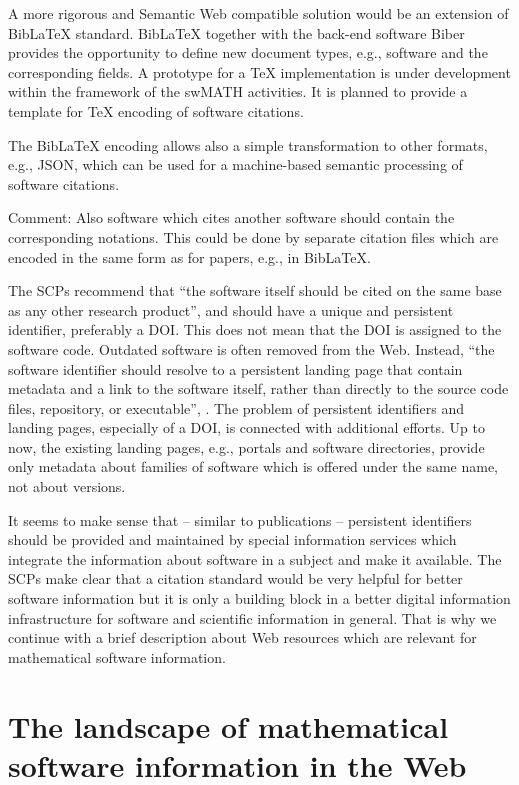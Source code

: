 \documentclass[12pt]{article}
\begin{document}
A more rigorous and Semantic Web compatible solution would be an extension of
Bib{\LaTeX} standard. Bib{\LaTeX} together with the back-end software Biber
provides the opportunity to define new document types, e.g., software and the
corresponding fields.  A prototype for a {\TeX} implementation is under
development within the framework of the swMATH activities. It is planned to
provide a template for {\TeX} encoding of software citations.

The Bib{\LaTeX} encoding allows also a simple transformation to other formats,
e.g., JSON, which can be used for a machine-based semantic processing of
software citations.

Comment: Also software which cites another software should contain the
corresponding notations. This could be done by separate citation files which
are encoded in the same form as for papers, e.g., in Bib\LaTeX.

The SCPs recommend that ``the software itself should be cited on the same base
as any other research product'', and should have a unique and persistent
identifier, preferably a DOI. This does not mean that the DOI is assigned to
the software code. Outdated software is often removed from the Web. Instead,
``the software identifier should resolve to a persistent landing page that
contain metadata and a link to the software itself, rather than directly to the
source code files, repository, or executable'',
\cite{SoftwareCitationPrinciples}.  The problem of persistent identifiers and
landing pages, especially of a DOI, is connected with additional efforts. Up to
now, the existing landing pages, e.g., portals and software directories,
provide only metadata about families of software which is offered under the
same name, not about versions.

It seems to make sense that -- similar to publications -- persistent
identifiers should be provided and maintained by special information services
which integrate the information about software in a subject and make it
available.  The SCPs make clear that a citation standard would be very helpful
for better software information but it is only a building block in a better
digital information infrastructure for software and scientific information in
general. That is why we continue with a brief description about Web resources
which are relevant for mathematical software information.

\section{The landscape of mathematical software information in the Web}
\end{document}
